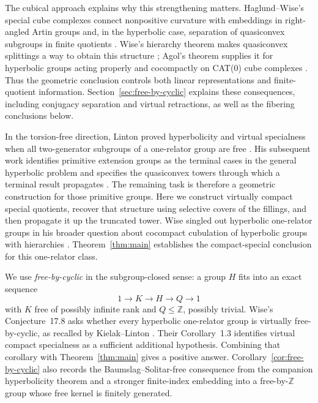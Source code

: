 The cubical approach explains why this strengthening matters.
Haglund--Wise's special cube complexes connect nonpositive curvature
with embeddings in right-angled Artin groups and, in the hyperbolic
case, separation of quasiconvex subgroups in finite quotients \cite{HaglundWise2008}.
Wise's hierarchy theorem makes quasiconvex splittings a way to obtain
this structure \cite[Theorem~13.1]{Wise2021}; Agol's theorem supplies
it for hyperbolic groups acting properly and cocompactly on CAT(0)
cube complexes \cite[Theorem~1.1]{Agol2013}.
Thus the geometric conclusion controls both linear representations and
finite-quotient information. Section~\ref{sec:free-by-cyclic} explains
these consequences, including conjugacy separation and virtual
retractions, as well as the fibering conclusions below.

In the torsion-free direction, Linton proved hyperbolicity and virtual
specialness when all two-generator subgroups of a one-relator group are
free \cite[Theorem~7.2 and Section~1]{LintonHierarchies2025}.
His subsequent work identifies primitive extension groups as the
terminal cases in the general hyperbolic problem and specifies the
quasiconvex towers through which a terminal result propagates
\cite{LintonHyperbolic2026}. The remaining task is therefore a
geometric construction for those primitive groups. Here we construct
virtually compact special quotients, recover that structure using
selective covers of the fillings, and then propagate it up the truncated
tower. Wise singled out hyperbolic one-relator groups in his broader
question about cocompact cubulation of hyperbolic groups with
hierarchies \cite[Problem~13.15]{Wise2014Cubical}.
Theorem~\ref{thm:main} establishes the compact-special conclusion for
this one-relator class.

We use \emph{free-by-cyclic} in the subgroup-closed sense: a group $H$
fits into an exact sequence
\[
1\longrightarrow K\longrightarrow H\longrightarrow Q\longrightarrow1
\]
with $K$ free of possibly infinite rank and $Q\leq\mathbb Z$, possibly
trivial. Wise's Conjecture~17.8 asks whether every hyperbolic one-relator
group is virtually free-by-cyclic, as recalled by Kielak--Linton
\cite[Section~1.1]{KielakLinton2024Virtually}. Their Corollary~1.3
identifies virtual compact specialness as a sufficient additional
hypothesis. Combining that corollary with Theorem~\ref{thm:main} gives a positive
answer. Corollary~\ref{cor:free-by-cyclic} also records the
Baumslag--Solitar-free consequence from the companion hyperbolicity
theorem and a stronger finite-index embedding into a free-by-$\mathbb Z$
group whose free kernel is finitely generated.

